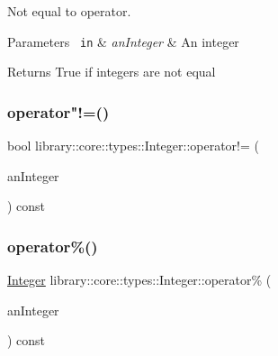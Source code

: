 Not equal to operator. 


\begin{DoxyCode}{0}
\end{DoxyCode}



\begin{DoxyParams}[1]{Parameters}
\mbox{\texttt{ in}}  & {\em an\+Integer} & An integer \\
\hline
\end{DoxyParams}
\begin{DoxyReturn}{Returns}
True if integers are not equal 
\end{DoxyReturn}
\mbox{\label{classlibrary_1_1core_1_1types_1_1_integer_a9c3c4e9564a3a8da5133207f3197d3a3}} 
\subsubsection{\texorpdfstring{operator"!=()}{operator!=()}\hspace{0.1cm}{\footnotesize\ttfamily [2/2]}}
{\footnotesize\ttfamily bool library\+::core\+::types\+::\+Integer\+::operator!= (\begin{DoxyParamCaption}\item[{const \mbox{\hyperlink{classlibrary_1_1core_1_1types_1_1_integer_a623afb1580f870fd8a1997b1c12c917d}{Integer\+::\+Value\+Type}} \&}]{an\+Integer }\end{DoxyParamCaption}) const}

\mbox{\label{classlibrary_1_1core_1_1types_1_1_integer_aaef6b38feb77d2d901cb75546690ff19}} 
\subsubsection{\texorpdfstring{operator\%()}{operator\%()}\hspace{0.1cm}{\footnotesize\ttfamily [1/2]}}
{\footnotesize\ttfamily \mbox{\hyperlink{classlibrary_1_1core_1_1types_1_1_integer}{Integer}} library\+::core\+::types\+::\+Integer\+::operator\% (\begin{DoxyParamCaption}\item[{const \mbox{\hyperlink{classlibrary_1_1core_1_1types_1_1_integer}{Integer}} \&}]{an\+Integer }\end{DoxyParamCaption}) const}

